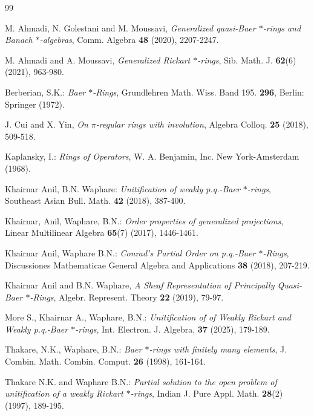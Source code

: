 \documentclass[11pt, one side,emlines]{amsart}
\theoremstyle{definition}
\numberwithin{equation}{section} \thispagestyle{empty} \voffset
\begin{document}
\begin{thebibliography}{99}

   M. Ahmadi,  N. Golestani and M. Moussavi, \textit{Generalized quasi-Baer $*$-rings and Banach $*$-algebras},  Comm. Algebra \textbf{48} (2020), 2207-2247.
 
  M. Ahmadi and A. Moussavi, \textit{ Generalized Rickart $*$-rings},   Sib. Math. J. \textbf{62}(6)
 (2021), 963-980.
 
 Berberian, S.K.: {\em Baer $*$-Rings}, 
                  Grundlehren Math. Wiss. Band 195. {\bf 296}, Berlin: Springer (1972).       
                                 
 
   J. Cui  and X. Yin, \textit{ On $\pi$-regular rings with involution},  Algebra Colloq. \textbf{25} (2018), 509-518.                 
                                 
 Kaplansky, I.: {\em Rings of Operators}, W. A. Benjamin, Inc. New York-Amsterdam
(1968).


 Khairnar Anil, B.N. Waphare: {\em Unitification of weakly p.q.-Baer $*$-rings}, Southeast Asian Bull. Math. {\bf 42} (2018), 387-400.         
 
  Khairnar, Anil, Waphare, B.N.: 
  {\em Order properties of generalized projections}, Linear Multilinear Algebra  { \bf 65}(7) (2017), 1446-1461. 
  
   Khairnar Anil, Waphare B.N.: 
  {\em Conrad's Partial Order on p.q.-Baer $*$-Rings}, Discussiones Mathematicae General Algebra and Applications   {\bf 38} (2018), 207-219.   
  
   Khairnar Anil and B.N. Waphare, {\em A Sheaf Representation of Principally Quasi-Baer $*$-Rings}, Algebr. Represent. Theory  { \bf 22} (2019), 79-97.             

      More S., Khairnar A., Waphare, B.N.: {\em Unitification of of Weakly Rickart and Weakly p.q.-Baer $*$-rings},
   Int. Electron. J. Algebra, {\bf 37 } (2025), 179-189.
                              
  Thakare, N.K., Waphare, B.N.: {\em Baer $*$-rings with finitely many elements},
                 J. Combin. Math. Combin. Comput. { \bf 26} (1998), 161-164.
                 
  Thakare N.K. and Waphare B.N.: {\em  Partial solution to the open problem of unitification of a weakly Rickart $*$-rings},
  Indian J. Pure Appl. Math. { \bf 28}(2) (1997), 189-195.



\end{thebibliography}
\end{document}
